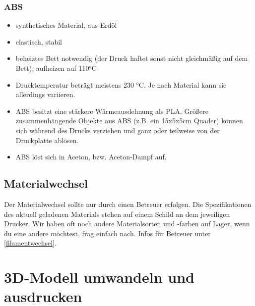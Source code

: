 \documentclass{\basedir/fablab-document}
\begin{document}
\subsubsection{ABS}
\begin{itemize}
 \item synthetisches Material, aus Erdöl
 \item elastisch, stabil
 \item beheiztes Bett notwendig (der Druck haftet sonst nicht gleichmäßig auf dem Bett), aufheizen auf 110°C
 \item Drucktemperatur beträgt meistens 230 °C. Je nach Material kann sie allerdings variieren.
 \item ABS besitzt eine stärkere Wärmeausdehnung als PLA. Größere zusammenhängende Objekte aus ABS (z.B. ein 15x5x5cm Quader) können sich während des Drucks verziehen und ganz oder teilweise von der Druckplatte ablösen.
 \item ABS löst sich in Aceton, bzw. Aceton-Dampf auf. 
\end{itemize}

\subsection{Materialwechsel}
Der Materialwechsel sollte nur durch einen Betreuer erfolgen. Die Spezifikationen des aktuell geladenen Materials
stehen auf einem Schild an dem jeweiligen Drucker. Wir haben oft noch andere Materialsorten und -farben auf Lager,
wenn du eine andere möchtest, frag einfach nach. Infos für Betreuer unter \ref{filamentwechsel}.

\section{3D-Modell umwandeln und ausdrucken}
\end{document}
